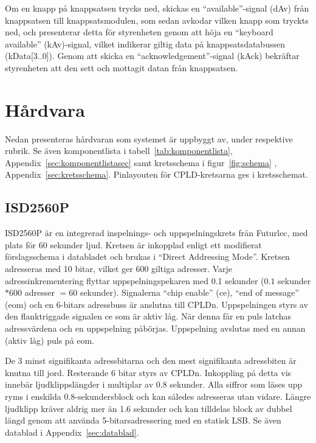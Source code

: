 \documentclass[a4paper,11pt]{article}
\begin{document}
Om en knapp på knappsatsen trycks ned, skickas en ``available''-signal (dAv) från knappsatsen till knappsatsmodulen, som sedan
avkodar vilken knapp som tryckts ned, och presenterar detta för styrenheten genom att höja en ``keyboard available'' (kAv)-signal,
vilket indikerar giltig data på knappsatsdatabussen (kData[3..0]). Genom att skicka en ``acknowledgement''-signal (kAck) bekräftar 
styrenheten att den sett och mottagit datan från knappsatsen.

\section{Hårdvara}

Nedan presenteras hårdvaran som systemet är uppbyggt av, under respektive rubrik. Se även komponentlista i tabell~\ref{tab:komponentlista}, Appendix~\ref{sec:komponentlistasec}
samt kretsschema i figur~\ref{fig:schema} , Appendix~\ref{sec:kretsschema}. Pinlayouten för CPLD-kretsarna ges i kretsschemat.

\label{hårdvara}
	\subsection{ISD2560P}
	\label{ISD2560P}
ISD2560P är en integrerad inspelnings- och uppspelningskrets från Futurlec, med plats för 60 sekunder ljud. Kretsen är inkopplad enligt ett modifierat förslagsschema i databladet och brukas i ``Direct Addressing Mode''. Kretsen adresseras med 10 bitar, vilket ger 600 giltiga adresser. Varje adressinkrementering flyttar uppspelningspekaren med 0.1 sekunder ($0.1 $ sekunder $* 600$ adresser $= 60$ sekunder). Signalerna ``chip enable'' (ce), ``end of message'' (eom) och en 6-bitars adressbuss är anslutna till CPLDn. Uppspelningen styrs av den flanktriggade signalen ce som är aktiv låg. När denna får en puls latchas adressvärdena och en uppspelning påbörjas. Uppspelning avslutas med en annan (aktiv låg) puls på eom.

De 3 minst signifikanta adressbitarna och den mest signifikanta adressbiten är knutna till jord. Resterande 6 bitar styrs av CPLDn. Inkoppling på detta vis innebär ljudklippslängder i multiplar av 0.8 sekunder. Alla siffror som läses upp ryms i enskilda 0.8-sekundersblock och kan således adresseras utan vidare. Längre ljudklipp kräver aldrig mer än 1.6 sekunder och kan tilldelas block av dubbel längd genom att använda 5-bitarsadressering med en statisk LSB.
	Se även datablad i Appendix~\ref{sec:datablad}.
\end{document}
